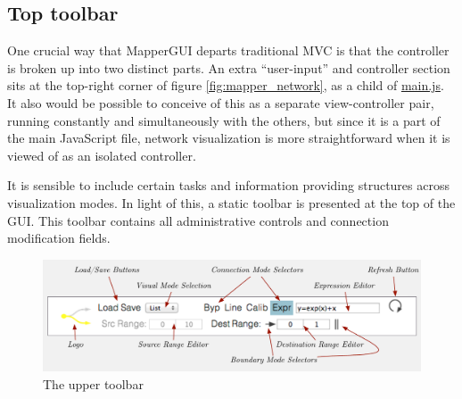 
	\subsection{Top toolbar} %
	\label{sec:top_toolbar}

One crucial way that MapperGUI departs traditional MVC is that the controller is broken up into two distinct parts. An extra ``user-input'' and controller section sits at the top-right corner of figure \ref{fig:mapper_network}, as a child of \url{main.js}.  It also would be possible to conceive of this as a separate view-controller pair, running constantly and simultaneously with the others, but since it is a part of the main JavaScript file, network visualization is more straightforward when it is viewed of as an isolated controller.

It is sensible to include certain tasks and information providing structures across visualization modes. In light of this, a static toolbar is presented at the top of the GUI. This toolbar contains all administrative controls and connection modification fields.

\begin{figure}[!ht]
\centering
	\includegraphics[width=1\textwidth]{figures/top_toolbar}
\caption{The upper toolbar}
\label{fig:toolbar}
\end{figure}

